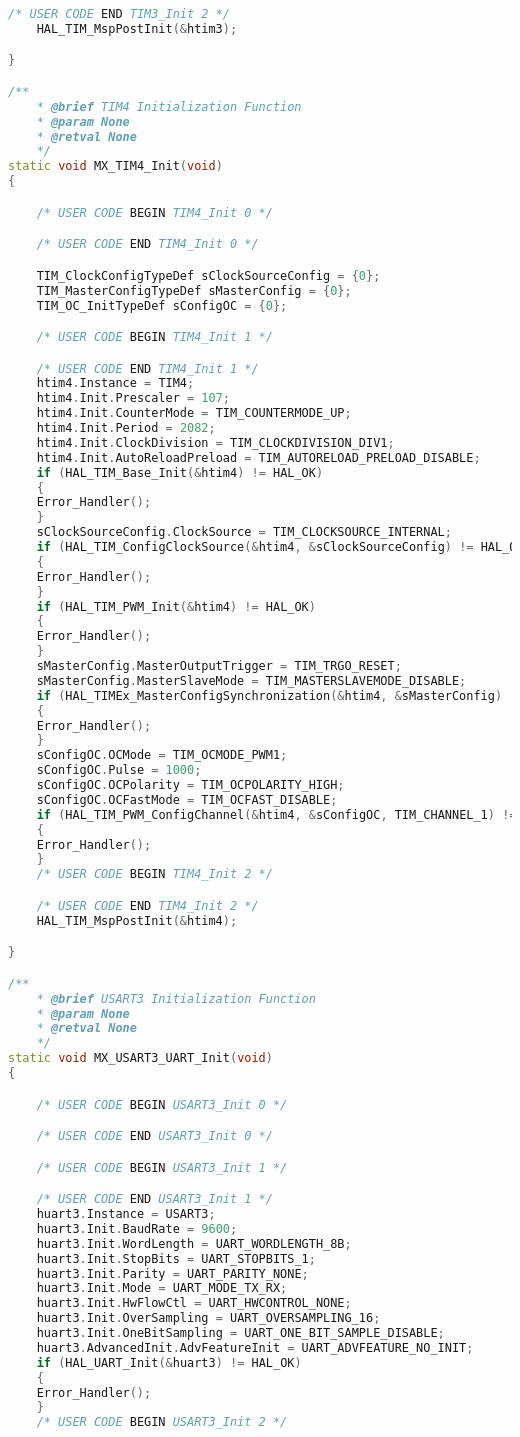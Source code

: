 \begin{lstlisting}[language=C++]
    /* USER CODE END TIM3_Init 2 */
    HAL_TIM_MspPostInit(&htim3);

}

/**
    * @brief TIM4 Initialization Function
    * @param None
    * @retval None
    */
static void MX_TIM4_Init(void)
{

    /* USER CODE BEGIN TIM4_Init 0 */

    /* USER CODE END TIM4_Init 0 */

    TIM_ClockConfigTypeDef sClockSourceConfig = {0};
    TIM_MasterConfigTypeDef sMasterConfig = {0};
    TIM_OC_InitTypeDef sConfigOC = {0};

    /* USER CODE BEGIN TIM4_Init 1 */

    /* USER CODE END TIM4_Init 1 */
    htim4.Instance = TIM4;
    htim4.Init.Prescaler = 107;
    htim4.Init.CounterMode = TIM_COUNTERMODE_UP;
    htim4.Init.Period = 2082;
    htim4.Init.ClockDivision = TIM_CLOCKDIVISION_DIV1;
    htim4.Init.AutoReloadPreload = TIM_AUTORELOAD_PRELOAD_DISABLE;
    if (HAL_TIM_Base_Init(&htim4) != HAL_OK)
    {
    Error_Handler();
    }
    sClockSourceConfig.ClockSource = TIM_CLOCKSOURCE_INTERNAL;
    if (HAL_TIM_ConfigClockSource(&htim4, &sClockSourceConfig) != HAL_OK)
    {
    Error_Handler();
    }
    if (HAL_TIM_PWM_Init(&htim4) != HAL_OK)
    {
    Error_Handler();
    }
    sMasterConfig.MasterOutputTrigger = TIM_TRGO_RESET;
    sMasterConfig.MasterSlaveMode = TIM_MASTERSLAVEMODE_DISABLE;
    if (HAL_TIMEx_MasterConfigSynchronization(&htim4, &sMasterConfig) != HAL_OK)
    {
    Error_Handler();
    }
    sConfigOC.OCMode = TIM_OCMODE_PWM1;
    sConfigOC.Pulse = 1000;
    sConfigOC.OCPolarity = TIM_OCPOLARITY_HIGH;
    sConfigOC.OCFastMode = TIM_OCFAST_DISABLE;
    if (HAL_TIM_PWM_ConfigChannel(&htim4, &sConfigOC, TIM_CHANNEL_1) != HAL_OK)
    {
    Error_Handler();
    }
    /* USER CODE BEGIN TIM4_Init 2 */

    /* USER CODE END TIM4_Init 2 */
    HAL_TIM_MspPostInit(&htim4);

}

/**
    * @brief USART3 Initialization Function
    * @param None
    * @retval None
    */
static void MX_USART3_UART_Init(void)
{

    /* USER CODE BEGIN USART3_Init 0 */

    /* USER CODE END USART3_Init 0 */

    /* USER CODE BEGIN USART3_Init 1 */

    /* USER CODE END USART3_Init 1 */
    huart3.Instance = USART3;
    huart3.Init.BaudRate = 9600;
    huart3.Init.WordLength = UART_WORDLENGTH_8B;
    huart3.Init.StopBits = UART_STOPBITS_1;
    huart3.Init.Parity = UART_PARITY_NONE;
    huart3.Init.Mode = UART_MODE_TX_RX;
    huart3.Init.HwFlowCtl = UART_HWCONTROL_NONE;
    huart3.Init.OverSampling = UART_OVERSAMPLING_16;
    huart3.Init.OneBitSampling = UART_ONE_BIT_SAMPLE_DISABLE;
    huart3.AdvancedInit.AdvFeatureInit = UART_ADVFEATURE_NO_INIT;
    if (HAL_UART_Init(&huart3) != HAL_OK)
    {
    Error_Handler();
    }
    /* USER CODE BEGIN USART3_Init 2 */


\end{lstlisting}
